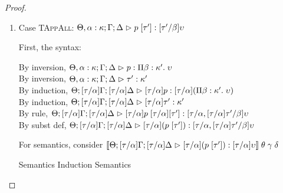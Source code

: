 \begin{proof}
\begin{enumerate}
\item Case \textsc{TAppAll}: $\judgeA[\Theta, \alpha:\kappa; \Gamma; \Delta]{p\;[\tau']}{[\tau'/\beta]\upsilon}$
  
  First, the syntax:
  \begin{tabbedproof}
    \oo By inversion, $\judgeA[\Theta, \alpha:\kappa; \Gamma; \Delta]{p}{\forallsort{\beta}{\kappa'}{\upsilon}}$\\
    \oo By inversion, $\judgeA[\Theta, \alpha:\kappa; \Gamma; \Delta]{\tau'}{\kappa'}$\\
    \oo By induction, $\judgeA[\Theta; {[\tau/\alpha]}\Gamma; {[\tau/\alpha]}\Delta]{{[\tau/\alpha]}p}{{[\tau/\alpha]}(\forallsort{\beta}{\kappa'}{\upsilon})}$\\
    \oo By induction, $\judgeA[\Theta; {[\tau/\alpha]}\Gamma; {[\tau/\alpha]}\Delta]{{[\tau/\alpha]}\tau'}{\kappa'}$\\
    \oo By rule, $\judgeA[\Theta; {[\tau/\alpha]}\Gamma; {[\tau/\alpha]}\Delta]{{[\tau/\alpha]}p\;{[\tau/\alpha]}[\tau']}{{[\tau/\alpha, [\tau/\alpha]\tau'/\beta]}\upsilon}$\\
    \oo By subst def, $\judgeA[\Theta; {[\tau/\alpha]}\Gamma; {[\tau/\alpha]}\Delta]{{[\tau/\alpha]}(p\;[\tau'])}{{[\tau/\alpha, [\tau/\alpha]\tau'/\beta]}\upsilon}$\\
  \end{tabbedproof}

  For semantics, consider $\interp{\judgeA[\Theta; {[\tau/\alpha]}\Gamma; {[\tau/\alpha]}\Delta]{{[\tau/\alpha]}(p\;[\tau'])}{{[\tau/\alpha]}\upsilon}}\;\theta\;\gamma\;\delta$
  \begin{eqnproof}
    {Semantics}
    {Induction}
          {Semantics}
  \end{eqnproof}



\end{enumerate}
\end{proof}
